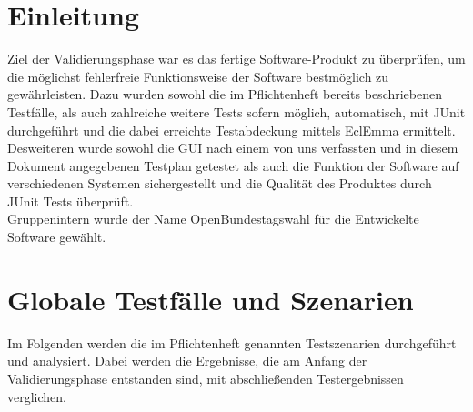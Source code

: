 \documentclass[12pt,a4paper,titlepage]{article}
\begin{document}
\section{Einleitung}

Ziel der Validierungsphase war es das fertige Software-Produkt zu überprüfen, um die möglichst fehlerfreie Funktionsweise der Software bestmöglich zu gewährleisten. Dazu wurden sowohl die im Pflichtenheft bereits beschriebenen Testfälle, als auch zahlreiche weitere Tests sofern möglich, automatisch, mit JUnit durchgeführt und die dabei erreichte Testabdeckung mittels EclEmma ermittelt.
Desweiteren wurde sowohl die GUI nach einem von uns verfassten und in diesem Dokument angegebenen Testplan getestet als auch die Funktion der Software auf verschiedenen Systemen sichergestellt und die Qualität des Produktes durch JUnit Tests überprüft.
\\
Gruppenintern wurde der Name OpenBundestagswahl für die Entwickelte Software gewählt.

\section{Globale Testfälle und Szenarien}
Im Folgenden werden die im Pflichtenheft genannten Testszenarien durchgeführt und analysiert. Dabei werden die Ergebnisse, die am Anfang der Validierungsphase entstanden sind, mit abschließenden Testergebnissen verglichen.
\end{document}

